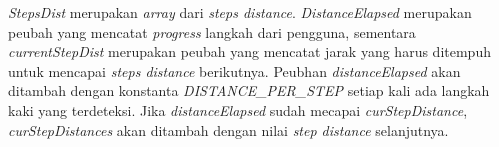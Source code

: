 \textit{StepsDist} merupakan \textit{array} dari \textit{steps distance}. \textit{DistanceElapsed} merupakan peubah yang mencatat \textit{progress} langkah dari pengguna, sementara \textit{currentStepDist} merupakan peubah yang mencatat jarak yang harus ditempuh untuk mencapai \textit{steps distance} berikutnya.
Peubhan \textit{distanceElapsed} akan ditambah dengan konstanta \textit{DISTANCE\_PER\_STEP} setiap kali ada langkah kaki yang terdeteksi.
Jika \textit{distanceElapsed} sudah mecapai \textit{curStepDistance}, \textit{curStepDistances} akan ditambah dengan nilai \textit{step distance} selanjutnya. 



